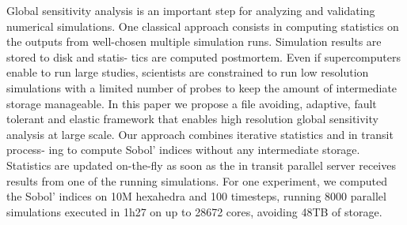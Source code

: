 \license


Global sensitivity analysis is an important step for analyzing and validating numerical simulations. One classical approach consists in computing statistics on the outputs from well-chosen multiple simulation runs. Simulation results are stored to disk and statis- tics are computed postmortem. Even if supercomputers enable to run large studies, scientists are constrained to run low resolution simulations with a limited number of probes to keep the amount of intermediate storage manageable. In this paper we propose a file avoiding, adaptive, fault tolerant and elastic framework that enables high resolution global sensitivity analysis at large scale. Our approach combines iterative statistics and in transit process- ing to compute Sobol’ indices without any intermediate storage. Statistics are updated on-the-fly as soon as the in transit parallel server receives results from one of the running simulations. For one experiment, we computed the Sobol’ indices on 10M hexahedra and 100 timesteps, running 8000 parallel simulations executed in 1h27 on up to 28672 cores, avoiding 48TB of storage.

